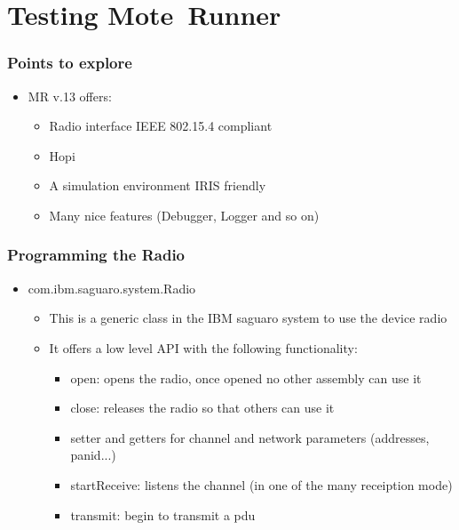 \section{Testing \mbox{Mote Runner}}
\begin{frame}[fragile]
  \frametitle{Points to explore}
  \begin{itemize}
    \item MR v.13 offers:
    \begin{itemize}
    	\item Radio interface IEEE 802.15.4 compliant
    	\item Hopi
    	\item A simulation environment IRIS friendly
    	\item Many nice features (Debugger, Logger and so on)
    \end{itemize}
  \end{itemize}
\end{frame}

\begin{frame}[fragile]
  \frametitle{Programming the Radio}
  \begin{itemize}
    \item com.ibm.saguaro.system.Radio
    \begin{itemize}
    	\item This is a generic class in the IBM saguaro system to use the device radio
    	\item It offers a low level API with the following functionality:
    	\begin{itemize}
	  \item open: opens the radio, once opened no other assembly can use it
	  \item close: releases the radio so that others can use it
	  \item setter and getters for channel and network parameters (addresses, panid...)
	  \item startReceive: listens the channel (in one of the many receiption mode)
	  \item transmit: begin to transmit a pdu
    	\end{itemize}
    \end{itemize}
  \end{itemize}
\end{frame}

